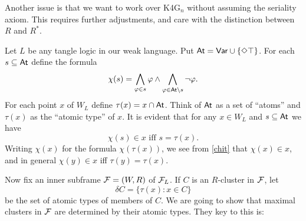 Another issue is that we want to work over K4G$_n$ without assuming the seriality axiom. This requires further adjustments, and care with the distinction between $R$ and $R^*$.


Let $L$ be any tangle logic in our weak language. Put
$\mathsf{At}=\mathsf{Var}\cup\{\Diamond\top\}$. For each $s\subseteq\mathsf{At}$ define the formula
$$
\chi(s)=\bigwedge_{\varphi\in s}\varphi\land\bigwedge_{\varphi\in \mathsf{At}\setminus s}\neg\varphi.
$$
For each point $x$ of $W_L$ define $\tau(x)=x\cap\mathsf{At}$. Think of $\mathsf{At}$ as a set of ``atoms'' and $\tau(x)$ as the ``atomic type'' of 
$x$. It is evident that for any $x\in W_L$ and $s\subseteq\mathsf{At}$
we have
\begin{equation} \label{chit}
\chi(s)\in x \text{ iff } s=\tau(x).
\end{equation}
Writing $\chi(x)$ for the formula $\chi(\tau(x))$, we see from \eqref{chit} that $\chi(x)\in x$, and in general $\chi(y)\in x$ iff $\tau(y)=\tau(x)$.

Now fix an inner subframe $\mathcal{F}=(W,R)$ of $\mathcal{F}_L$.  If $C$ is an $R$-cluster in $\mathcal{F}$,
let 
$$
\delta C=\{\tau(x):x\in C\}
$$
be the set of atomic types of members of $C$. We are going to show that maximal clusters in $\mathcal{F}$ are determined by their atomic types. They key to this is:  

